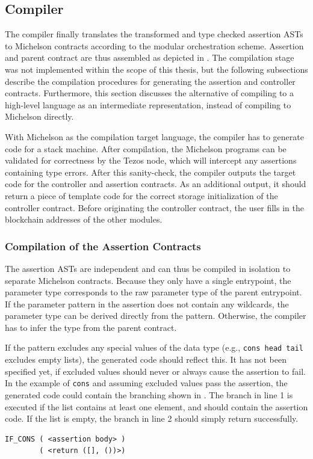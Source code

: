\subsection{Compiler}\label{sec:compiler}
The compiler finally translates the transformed and type checked assertion ASTs to Michelson contracts according to the modular orchestration scheme. Assertion and parent contract are thus assembled as depicted in . The compilation stage was not implemented within the scope of this thesis, but the following subsections describe the compilation procedures for generating the assertion and controller contracts. Furthermore, this section discusses the alternative of compiling to a high-level language as an intermediate representation, instead of compiling to Michelson directly.

With Michelson as the compilation target language, the compiler has to generate code for a stack machine. After compilation, the Michelson programs can be validated for correctness by the Tezos node, which will intercept any assertions containing type errors. After this sanity-check, the compiler outputs the target code for the controller and assertion contracts. As an additional output, it should return a piece of template code for the correct storage initialization of the controller contract. Before originating the controller contract, the user fills in the blockchain addresses of the other modules.

\subsubsection{Compilation of the Assertion Contracts}
The assertion ASTs are independent and can thus be compiled in isolation to separate Michelson contracts. Because they only have a single entrypoint, the parameter type corresponds to the raw parameter type of the parent entrypoint. If the parameter pattern in the assertion does not contain any wildcards, the parameter type can be derived directly from the pattern. Otherwise, the compiler has to infer the type from the parent contract.

If the pattern excludes any special values of the data type (e.g., \texttt{cons head tail} excludes empty lists), the generated code should reflect this. It has not been specified yet, if excluded values should never or always cause the assertion to fail. In the example of \texttt{cons} and assuming excluded values pass the assertion, the generated code could contain the branching shown in . The branch in line 1 is executed if the list contains at least one element, and should contain the assertion code. If the list is empty, the branch in line 2 should simply return successfully. 
\begin{lstlisting}[language=Michelson, label=lst:cons, caption=Exclusion of empty lists in the assertion]
IF_CONS ( <assertion body> )
        ( <return ([], ())>)
\end{lstlisting}

